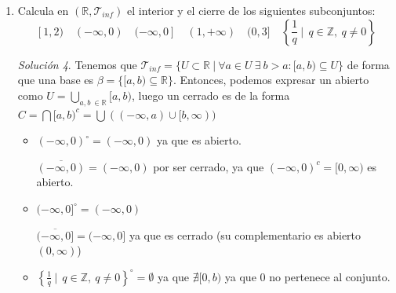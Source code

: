 \documentclass[12pt,twoside]{report}
\newcommand\mc[1]{\mathcal{#1}}
\theoremstyle{azul}
\theoremstyle{azul2}
\theoremstyle{plain}
\theoremstyle{definition}
\theoremstyle{remark}
\newtheorem*{sol}{Solución}
\begin{document}
\begin{enumerate}
\begin{enumerate}[a)]
\begin{sol}
    Si $x$ es un punto interior, existe un entorno suyo $U \subseteq A$, por tanto $x \in  A^{\circ}$.
    \end{sol}
    \item $A^{\circ}=A$ si y sólo si $A$ es abierto.
    \begin{sol}
    $\Rightarrow$) Supongamos que $A^{\circ}=A$. Esto implica que $A$ es un entorno de todos sus puntos, luego es abierto.
    
    $\Leftarrow)$ Si $A$ es abierto, es un entorno de cada uno de sus puntos, luego $A=A
    ^{\circ}$
    \end{sol}
    \item $(A^{\circ})^{\circ}=A^{\circ}$.
\begin{sol}
Como $A^{\circ}$ es abierto, su interior será él mismo, luego $(A^{\circ})^{\circ}=A^{\circ}$
\end{sol}
\end{enumerate}
\item Calcula en $(\mathbb{R}, \mc{T}_{inf})$ el interior y el cierre de los siguientes subconjuntos:
$$[1,2) \quad (- \infty, 0) \quad (-\infty, 0] \quad (1,+\infty) \quad (0,3] \quad \left\{\frac{1}{q} \: | \: \:  q \in \mathbb{Z}, \: q \neq 0 \right\}$$
\begin{sol}
Tenemos que $\mc{T}_{inf}=\{U \subset \mathbb{R} \: | \: \forall a \in U \: \exists \: b > a : [a,b) \subseteq U\}$ de forma que una base es $\beta = \{[a,b) \subseteq \mathbb{R}\}$. Entonces, podemos expresar un abierto como $\displaystyle U=\underset{a,b \: \in \mathbb{R}}{\bigcup} [a,b)$, luego un cerrado es de la forma $\displaystyle C=\bigcap [a,b)^c=\bigcup ((-\infty,a) \cup [b,\infty))$
\begin{itemize}
    \item $(-\infty,0)^{\circ}=(-\infty,0)$ ya que es abierto.
    
    $\overline{(-\infty,0)}=(-\infty,0)$ por ser cerrado, ya que $(-\infty,0)^c=[0,\infty)$ es abierto.
    \item $(-\infty,0]^{\circ}=(-\infty,0)$
    
     $\overline{(-\infty,0]}=(-\infty,0]$ ya que es cerrado (su complementario es abierto $(0,\infty)$)
     
     \item $\left\{\frac{1}{q} \: | \: \:  q \in \mathbb{Z}, \: q \neq 0 \right\}^{\circ}= \emptyset$ ya que $\nexists [0,b)$ ya que $0$ no pertenece al conjunto. 
     

\end{itemize}
\end{sol}
\end{enumerate}
\end{document}
